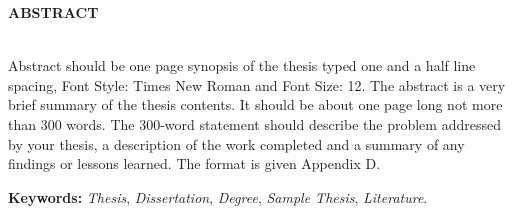 {\centerline { {\textbf{ABSTRACT}}}}
~\\

Abstract should be one page synopsis of the thesis typed one and a half line spacing, Font Style: Times New Roman and Font Size: 12.  The abstract is a very brief summary of the thesis contents. It should be about one page long not more than 300 words.  The 300-word statement should describe the problem addressed by your thesis, a description of the work completed and a summary of any findings or lessons learned. The format is given Appendix D.
     
\vskip 0.5cm
\noindent
\textbf{Keywords:} {\it Thesis}, {\it Dissertation}, {\it Degree}, {\it Sample Thesis}, {\it Literature}.  
